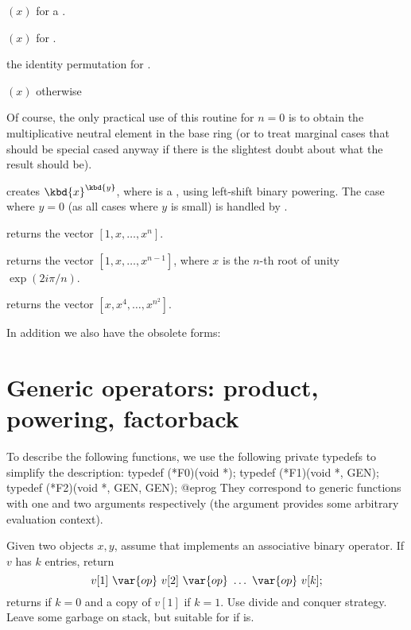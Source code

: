 \item {}$(x)$ for a .

\item {}$(x)$ for .

\item the identity permutation for .

\item {}$(x)$ otherwise

Of course, the only practical use of this routine for $n = 0$ is
to obtain the multiplicative neutral element in the base ring (or to treat
marginal cases that should be special cased anyway if there is the slightest
doubt about what the result should be).

 creates $\kbd{x}^{\kbd{y}}$, where  is a
, using left-shift binary powering. The case where $y = 0$
(as all cases where $y$ is small) is handled by .

 returns the vector $[1,x,\dots,x^n]$.

 returns the vector
$[1,x,\dots,x^{n-1}]$, where $x$ is the $n$-th root of unity $\exp(2i\pi/n)$.

 returns the vector $[x,x^4,\dots,x^{n^2}]$.

In addition we also have the obsolete forms:





\section{Generic operators: product, powering, factorback}

To describe the following functions, we use the following private typedefs
to simplify the description:
\bprog
  typedef (*F0)(void *);
  typedef (*F1)(void *, GEN);
  typedef (*F2)(void *, GEN, GEN);
@eprog
\noindent They correspond to generic functions with one and two arguments
respectively (the  argument provides some arbitrary evaluation
context).

Given two objects $x,y$, assume that  implements an
associative binary operator. If $v$ has $k$ entries, return
$$v[1]~\var{op}~v[2]~\var{op}~\ldots ~\var{op}~v[k];$$
returns  if $k = 0$ and a copy of $v[1]$ if $k = 1$.
Use divide and conquer strategy. Leave some garbage on stack, but suitable for
 if  is.

